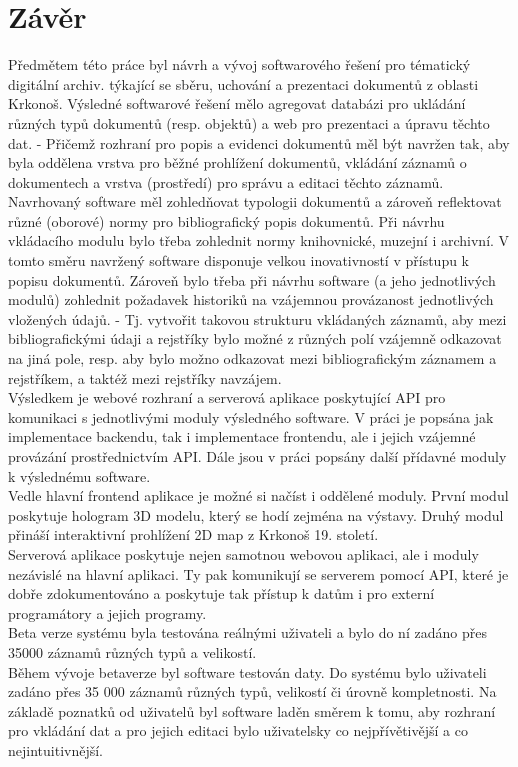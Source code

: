 \chapter*{Závěr}

Předmětem této práce byl návrh a vývoj softwarového řešení pro tématický
digitální archiv. týkající se sběru, uchování a prezentaci dokumentů z oblasti
Krkonoš. Výsledné softwarové řešení mělo agregovat databázi pro ukládání různých
typů dokumentů (resp. objektů) a web pro prezentaci a úpravu těchto dat. - Přičemž
rozhraní pro popis a evidenci dokumentů měl být navržen
tak, aby byla oddělena vrstva pro běžné prohlížení dokumentů, vkládání záznamů o
dokumentech a vrstva (prostředí) pro správu a editaci těchto záznamů.
Navrhovaný software měl zohledňovat typologii dokumentů a zároveň reflektovat
různé (oborové) normy pro bibliografický popis dokumentů. Při návrhu vkládacího
modulu bylo třeba zohlednit normy knihovnické, muzejní i archivní. V tomto směru
navržený software disponuje velkou inovativností v přístupu k popisu dokumentů.
Zároveň bylo třeba při návrhu software (a jeho jednotlivých modulů)
zohlednit požadavek historiků na vzájemnou provázanost jednotlivých vložených
údajů. - Tj. vytvořit takovou strukturu vkládaných záznamů, aby mezi
bibliografickými údaji a rejstříky bylo možné z různých polí vzájemně odkazovat
na jiná pole, resp. aby bylo možno odkazovat mezi bibliografickým záznamem a
rejstříkem, a taktéž mezi rejstříky navzájem.
\\

Výsledkem je webové rozhraní a serverová aplikace poskytující API pro komunikaci
s jednotlivými moduly výsledného software. V práci je popsána jak implementace
backendu, tak i implementace frontendu, ale i jejich vzájemné provázání
prostřednictvím API. Dále jsou v práci popsány další přídavné moduly k
výslednému software.
\\

Vedle hlavní frontend aplikace je možné si načíst i oddělené moduly.
První modul poskytuje hologram 3D modelu, který se hodí zejména na výstavy.
Druhý modul přináší interaktivní prohlížení 2D map z Krkonoš 19. století.
\\


Serverová aplikace poskytuje nejen samotnou webovou aplikaci, ale i
moduly nezávislé na hlavní aplikaci. Ty pak komunikují se serverem pomocí API,
které je dobře zdokumentováno a poskytuje tak přístup k datům i pro
externí programátory a jejich programy.
\\


Beta verze systému byla testována reálnými uživateli a bylo do ní
zadáno přes 35000 záznamů různých typů a velikostí.
\\

Během vývoje betaverze byl software testován  daty. Do systému bylo
uživateli zadáno přes 35 000 záznamů různých typů, velikostí či úrovně
kompletnosti. Na základě poznatků od uživatelů byl software laděn směrem k tomu,
aby rozhraní pro vkládání dat a pro jejich editaci bylo uživatelsky co
nejpřívětivější a co nejintuitivnější.
\\
